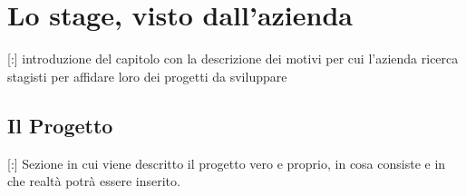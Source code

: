\documentclass[11pt]{book}              %
\begin{document}
\newpage

\chapter{Lo stage, visto dall'azienda}
\thispagestyle{fancy} 
[:] introduzione del capitolo con la descrizione dei motivi per cui l'azienda ricerca stagisti per affidare loro dei progetti da sviluppare

\section{Il Progetto}

[:] Sezione in cui viene descritto il progetto vero e proprio, in cosa consiste e in che realtà potrà essere inserito. 
\end{document}
